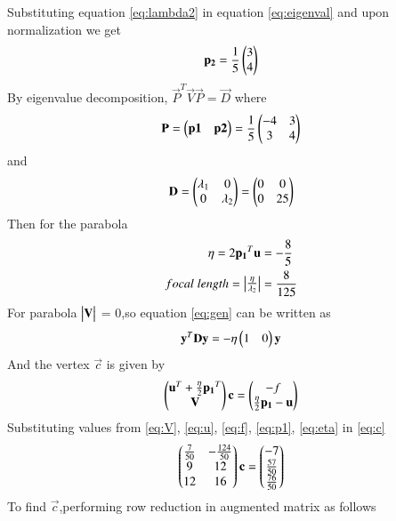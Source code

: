 \documentclass[journal,12pt,twocolumn]{IEEEtran}
\begin{document}
Substituting equation \eqref{eq:lambda2} in equation \eqref{eq:eigenval} and upon normalization we get
\begin{align}
    \mathbf{p_2} = \frac{1}{5}\begin{pmatrix}3\\4\end{pmatrix}
\end{align}
By eigenvalue decomposition, $\vec{P}^T\vec{V}\vec{P}=\vec{D}$
where
\begin{align}
    \mathbf{P} = \begin{pmatrix}\mathbf{p1}&\mathbf{p2}\end{pmatrix}=\frac{1}{5}\begin{pmatrix}-4&3\\3&4\end{pmatrix}
\end{align}
and
\begin{align}
    \mathbf{D} = \begin{pmatrix}\lambda_1&0\\0&\lambda_2\end{pmatrix} = \begin{pmatrix}0&0\\0&25\end{pmatrix}
\end{align}
Then for the parabola
\begin{align}
    \eta = 2\mathbf{p_1}^T\mathbf{u}&=-\frac{8}{5}\label{eq:eta}\\
    focal\;length =\begin{vmatrix}\frac{\eta}{\lambda_2}\end{vmatrix}&=\frac{8}{125}
\end{align}
For parabola $\begin{vmatrix}\mathbf{V}\end{vmatrix}$ = 0,so equation \eqref{eq:gen} can be written as
\begin{align}
    \mathbf{y}^T\mathbf{D}\mathbf{y}=-\eta\begin{pmatrix}1&0\end{pmatrix}\mathbf{y}
\end{align}
And the vertex $\vec{c}$ is given by
\begin{align}
    \begin{pmatrix}\mathbf{u}^T+\frac{\eta}{2}\mathbf{p_1}^T\\\mathbf{V}\end{pmatrix}\mathbf{c}=\begin{pmatrix}-f\\\frac{\eta}{2}\mathbf{p_1}-\mathbf{u}\end{pmatrix}\label{eq:c}
\end{align}
Substituting values from \eqref{eq:V}, \eqref{eq:u}, \eqref{eq:f}, \eqref{eq:p1}, \eqref{eq:eta} in \eqref{eq:c}
\begin{align}
    \begin{pmatrix}\frac{7}{50}&-\frac{124}{50}\\9&12\\12&16\end{pmatrix}\mathbf{c}=\begin{pmatrix}-7\\\frac{57}{50}\\\frac{76}{50}\end{pmatrix}
\end{align}
To find $\vec{c}$,performing row reduction in augmented matrix as follows
\end{document}
